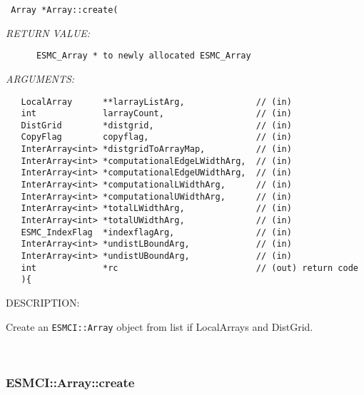   
\begin{verbatim} Array *Array::create(\end{verbatim}{\em RETURN VALUE:}
\begin{verbatim}      ESMC_Array * to newly allocated ESMC_Array\end{verbatim}{\em ARGUMENTS:}
\begin{verbatim}   LocalArray      **larrayListArg,              // (in)
   int             larrayCount,                  // (in)
   DistGrid        *distgrid,                    // (in)
   CopyFlag        copyflag,                     // (in)
   InterArray<int> *distgridToArrayMap,          // (in)
   InterArray<int> *computationalEdgeLWidthArg,  // (in)
   InterArray<int> *computationalEdgeUWidthArg,  // (in)
   InterArray<int> *computationalLWidthArg,      // (in)
   InterArray<int> *computationalUWidthArg,      // (in)
   InterArray<int> *totalLWidthArg,              // (in)
   InterArray<int> *totalUWidthArg,              // (in)
   ESMC_IndexFlag  *indexflagArg,                // (in)
   InterArray<int> *undistLBoundArg,             // (in)
   InterArray<int> *undistUBoundArg,             // (in)
   int             *rc                           // (out) return code
   ){\end{verbatim}
{\sf DESCRIPTION:\\ }


      Create an {\tt ESMCI::Array} object from list if LocalArrays and DistGrid. 
 
\mbox{}\hrulefill\
 
\subsubsection [ESMCI::Array::create] {ESMCI::Array::create}


